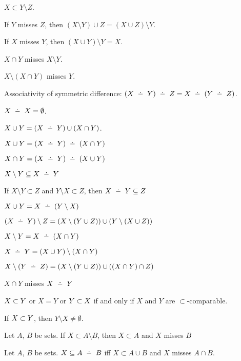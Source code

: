 \documentclass{article}
\begin{document}
\begin{thm}
  $X\subset Y\setminus Z$.
\item\label{xboole1:87} If $Y$ misses $Z$, then $(X\setminus Y)\cup Z=(X\cup Z)\setminus Y$.
\item\label{xboole1:88} If $X$ misses $Y$, then $(X\cup Y)\setminus Y=X$.
\item\label{xboole1:89} $X\cap Y$ misses $X\setminus Y$.
\item\label{xboole1:90} $X\setminus(X\cap Y)$ misses $Y$.
\item\label{xboole1:91} Associativity of symmetric difference:
  $(X\symdiff Y)\symdiff Z=X\symdiff(Y\symdiff Z)$.
\item\label{xboole1:92} $X\symdiff X=\emptyset$.
\item\label{xboole1:93} $X\cup Y=(X\symdiff Y)\cup(X\cap Y)$.
\item\label{xboole1:94} $X \cup Y = (X \symdiff Y) \symdiff (X \cap Y)$
\item\label{xboole1:95} $X \cap Y = (X \symdiff Y) \symdiff (X \cup Y)$
\item\label{xboole1:96} $X \setminus Y \subset X \symdiff Y$
\item\label{xboole1:97} If $X \setminus Y \subset Z$ and $Y \setminus X \subset Z$, then $X \symdiff Y \subset Z$
\item\label{xboole1:98} $X \cup Y = X \symdiff (Y \setminus X)$
\item\label{xboole1:99} $(X \symdiff Y) \setminus Z = (X \setminus (Y \cup Z)) \cup (Y \setminus (X \cup Z))$
\item\label{xboole1:100} $X \setminus Y = X \symdiff (X \cap Y)$
\item\label{xboole1:101} $X \symdiff Y = (X \cup Y) \setminus (X \cap Y)$
\item\label{xboole1:102} $X \setminus (Y \symdiff Z) = (X \setminus (Y \cup Z)) \cup ((X \cap Y) \cap Z)$
\item\label{xboole1:103} $X \cap Y$ misses $X \symdiff Y$
\item\label{xboole1:104} $X \properSubset  Y$ or $X = Y$ or $Y \properSubset  X$ if and only if
  $X$ and $Y$ are $\subset$-comparable.
\item\label{xboole1:105} If $X \properSubset  Y$, then $Y \setminus X \neq \emptyset$.
\item\label{xboole1:106} Let $A$, $B$ be sets. If $X \subset A \setminus B$, then $X \subset A$ and $X$ misses $B$
\item\label{xboole1:107} Let $A$, $B$ be sets. $X \subset A \symdiff B$ iff $X \subset A \cup B$ and $X$ misses $A \cap B$.

\end{thm}
\end{document}
